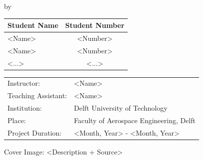 \begin{titlepage}

\begin{center}

{\makeatletter
\largetitlestyle\fontsize{45}{45}\selectfont\@title
\makeatother}

{\makeatletter
\titlestyle\fontsize{20}{20}\selectfont\@subtitle    
\makeatother}

\bigskip
\bigskip

by

\bigskip
\bigskip

{\makeatletter
\largetitlestyle\fontsize{25}{25}\selectfont\@author
\makeatother}

\bigskip
\bigskip

\setlength\extrarowheight{2pt}
\begin{tabular}{lc}
    Student Name & Student Number \\\hline
    <Name> & <Number> \\
    <Name> & <Number> \\
    <...> & <...> \\
\end{tabular}

\vfill

\begin{tabular}{ll}
    Instructor: & <Name> \\
    Teaching Assistant: & <Name> \\
    Institution: & Delft University of Technology \\
    Place: & Faculty of Aerospace Engineering, Delft \\
    Project Duration: & <Month, Year> - <Month, Year>
\end{tabular}

\vspace{1cm}
\small{Cover Image: <Description + Source>}

\end{center}


\end{titlepage}